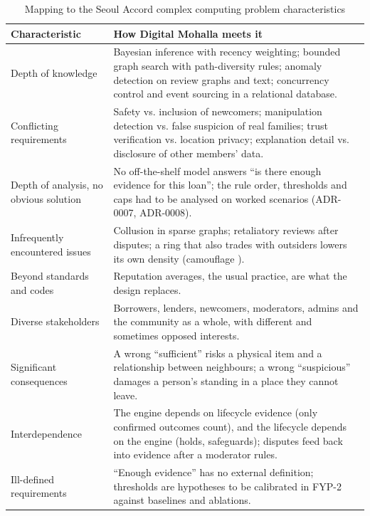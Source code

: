 \begin{table}[!htbp]
\centering
\caption{Mapping to the Seoul Accord complex computing problem characteristics}\label{tab:mapping-seoul-accord-complex}
\begin{tabular}{@{}L{111pt}L{268pt}@{}}
\toprule
Characteristic & How Digital Mohalla meets it \\
\midrule
Depth of knowledge & Bayesian inference with recency weighting; bounded graph search with path-diversity rules; anomaly detection on review graphs and text; concurrency control and event sourcing in a relational database. \\
Conflicting requirements & Safety vs. inclusion of newcomers; manipulation detection vs. false suspicion of real families; trust verification vs. location privacy; explanation detail vs. disclosure of other members' data. \\
Depth of analysis, no obvious solution & No off-the-shelf model answers ``is there enough evidence for this loan''; the rule order, thresholds and caps had to be analysed on worked scenarios (ADR-0007, ADR-0008). \\
Infrequently encountered issues & Collusion in sparse graphs; retaliatory reviews after disputes; a ring that also trades with outsiders lowers its own density (camouflage \cite{hooi2016}). \\
Beyond standards and codes & Reputation averages, the usual practice, are what the design replaces. \\
Diverse stakeholders & Borrowers, lenders, newcomers, moderators, admins and the community as a whole, with different and sometimes opposed interests. \\
Significant consequences & A wrong ``sufficient'' risks a physical item and a relationship between neighbours; a wrong ``suspicious'' damages a person's standing in a place they cannot leave. \\
Interdependence & The engine depends on lifecycle evidence (only confirmed outcomes count), and the lifecycle depends on the engine (holds, safeguards); disputes feed back into evidence after a moderator rules. \\
Ill-defined requirements & ``Enough evidence'' has no external definition; thresholds are hypotheses to be calibrated in FYP-2 against baselines and ablations. \\
\bottomrule
\end{tabular}
\end{table}
